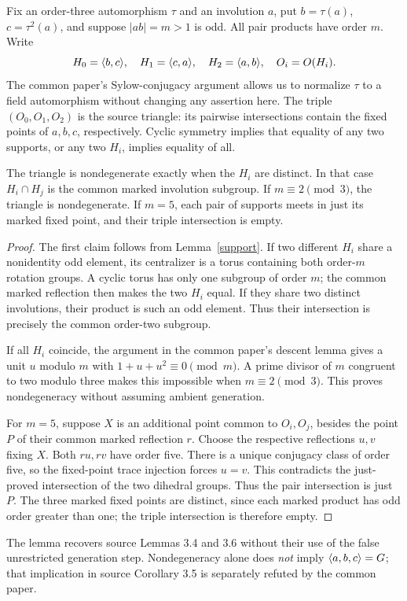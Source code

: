 \documentclass[11pt,a4paper]{article}
\begin{document}
Fix an order-three automorphism $\tau$ and an involution $a$, put
$b=\tau(a)$, $c=\tau^2(a)$, and suppose $|ab|=m>1$ is odd. All pair
products have order $m$. Write
\[
 H_0=\langle b,c\rangle,\quad H_1=\langle c,a\rangle,\quad H_2=\langle a,b\rangle,\quad O_i=O(H_i).
\]
The common paper's Sylow-conjugacy argument allows us to normalize $\tau$
to a field automorphism without changing any assertion here.
The triple $(O_0,O_1,O_2)$ is the source triangle: its pairwise intersections
contain the fixed points of $a,b,c$, respectively. Cyclic symmetry implies
that equality of any two supports, or any two $H_i$, implies equality of all.

\begin{lemma}\label{proper}
The triangle is nondegenerate exactly when the $H_i$ are distinct.
In that case $H_i\cap H_j$ is the common marked involution subgroup.
If $m\equiv2\pmod3$, the triangle is nondegenerate. If $m=5$, each pair
of supports meets in just its marked fixed point, and their triple
intersection is empty.
\end{lemma}
\begin{proof}
The first claim follows from Lemma~\ref{support}. If two different $H_i$
share a nonidentity odd element, its centralizer is a torus containing
both order-$m$ rotation groups. A cyclic torus has only one subgroup of
order $m$; the common marked reflection then makes the two $H_i$ equal.
If they share two distinct involutions, their product is such an odd element.
Thus their intersection is precisely the common order-two subgroup.

If all $H_i$ coincide, the argument in the common paper's descent lemma
gives a unit $u$ modulo $m$ with $1+u+u^2\equiv0\pmod m$. A prime divisor
of $m$ congruent to two modulo three makes this impossible when
$m\equiv2\pmod3$. This proves nondegeneracy without assuming ambient generation.

For $m=5$, suppose $X$ is an additional point common to $O_i,O_j$, besides
the point $P$ of their common marked reflection $r$. Choose the respective
reflections $u,v$ fixing $X$. Both $ru,rv$ have order five. There is a unique
conjugacy class of order five, so the fixed-point trace injection forces
$u=v$. This contradicts the just-proved intersection of the two dihedral
groups. Thus the pair intersection is just $P$. The three marked fixed
points are distinct, since each marked product has odd order greater than
one; the triple intersection is therefore empty.
\end{proof}
The lemma recovers source Lemmas 3.4 and 3.6 without their use of the false
unrestricted generation step. Nondegeneracy alone does \emph{not} imply
$\langle a,b,c\rangle=G$; that implication in source Corollary 3.5 is separately
refuted by the common paper.
\end{document}
